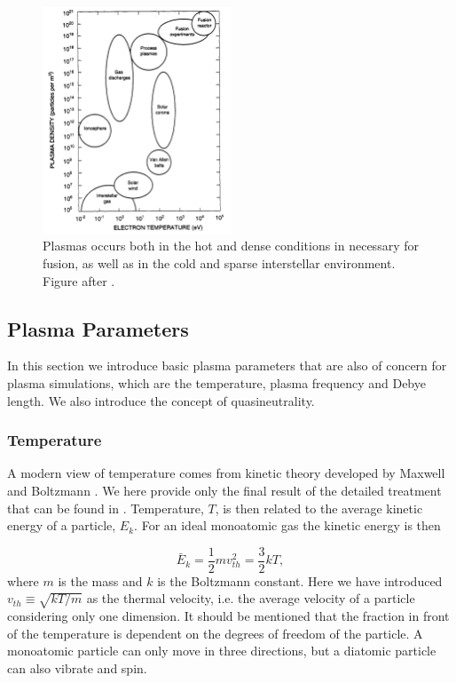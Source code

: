 	\begin{figure}
		\label{fig:plasma_density}
		\begin{center}
			\includegraphics[width = 0.5\textwidth]{figures/theory/plasma/plasma_density}
		\end{center}
		\caption{Plasmas occurs both in the hot and dense conditions in necessary for fusion, as
		well as in the cold and sparse interstellar environment. Figure after \citet{goldston_introduction_1995}.
		}
	\end{figure}



    \subsection{Plasma Parameters}
		In this section we introduce basic plasma parameters that are also of concern for plasma simulations, which
		are the temperature, plasma frequency and Debye length. We also introduce the concept of quasineutrality.
		\label{sec:parameters}
		\subsubsection{Temperature}
		A modern view of temperature comes from kinetic theory developed by
		Maxwell and Boltzmann \citep{swendsen_statistical_2006}. We here provide only the final result
		of the detailed treatment that can be found in \citet{goldston_introduction_1995}.
		Temperature, \(T\), is then related to the average kinetic energy of a particle, \(E_k\).
		For an ideal monoatomic gas the kinetic energy is then

		\begin{equation}
			\bar{E}_k = \frac{1}{2} m v_{th}^2 = \frac{3}{2} kT, \label{eq:temperature}
		\end{equation}
		where \(m\) is the mass and \(k\) is the Boltzmann constant.
		Here we have introduced \(v_{th} \equiv  \sqrt{kT/m}\) as the thermal velocity, i.e.
		the average velocity of a particle considering only one dimension. It should be mentioned that the fraction in
		front of the temperature is dependent on the degrees of freedom of the particle.
		A monoatomic particle can only move in three directions, but a diatomic particle
		can also vibrate and spin.


